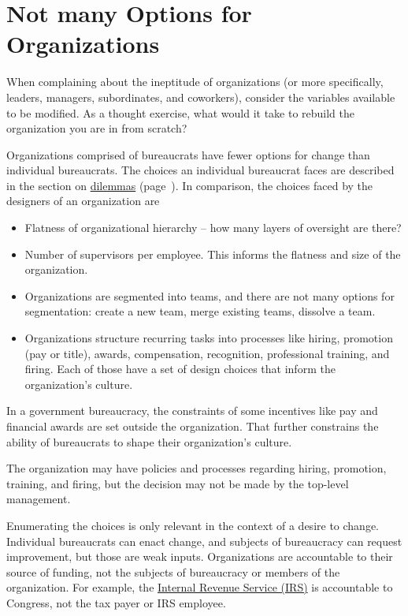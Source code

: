 \section{Not many Options for Organizations}

When complaining about the ineptitude of organizations (or more specifically, leaders, managers, subordinates, and coworkers), consider the variables available to be modified. As a thought exercise, what would it take to rebuild the organization you are in from scratch? 

Organizations comprised of bureaucrats have fewer options for change than individual bureaucrats. The choices an individual bureaucrat faces are described in the section on 
\hyperref[sec:dilemma-trilemma]{dilemmas}
(page~\pageref{sec:dilemma-trilemma}).
In comparison, the choices faced by the designers of an organization are
\begin{itemize}
    \item Flatness of organizational hierarchy -- how many layers of oversight are there?
    \item Number of supervisors per employee. This informs the flatness and size of the organization.
    \item Organizations are segmented into teams, and there are not many options for segmentation: create a new team, merge existing teams, dissolve a team.
    \item Organizations structure recurring tasks into processes like hiring, promotion (pay or title), awards, compensation, recognition, professional training, and firing. Each of those have a set of design choices that inform the organization's culture.
\end{itemize}
In a government bureaucracy, the constraints of some incentives like pay and financial awards are set outside the organization. That further constrains the ability of bureaucrats to shape their organization's culture.

The organization may have policies and processes regarding hiring, promotion, training, and firing, but the decision may not be made by the top-level management. 

Enumerating the choices is only relevant in the context of a desire to change. 
Individual bureaucrats can enact change, and subjects of bureaucracy can request improvement, but those are weak inputs. 
Organizations are accountable to their source of funding, not the subjects of bureaucracy or members of the organization. For example, the \href{https://en.wikipedia.org/wiki/Internal_Revenue_Service}{Internal Revenue Service (IRS)} 
is accountable to Congress, not the tax payer or IRS employee. 

